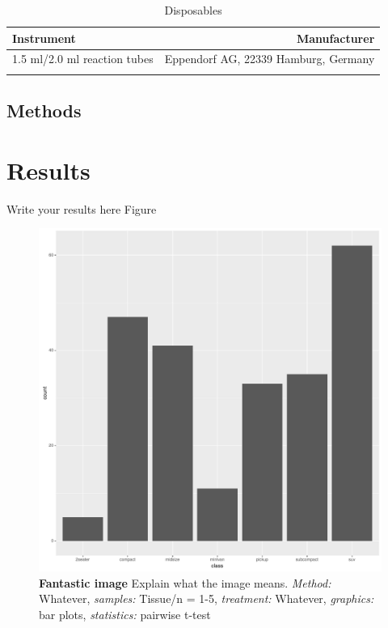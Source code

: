 \documentclass[
	    a4paper, 				%
	    bibliography=totocnumbered,		%
	    listof=totocnumbered,		%
	    11pt, 				%
]{scrreprt}
\begin{document}
				\begin{longtable}{||l|r||}
					Instrument&Manufacturer\\
					\hline\hline
						\multirow{2}{0.62\textwidth}{1.5 ml/2.0 ml reaction tubes}&
						\multirow{2}{0.30\textwidth}{Eppendorf AG, 22339 Hamburg, Germany}\\&\\										
					\hline\hline
					\caption{Disposables}
				\end{longtable}
		
		\section{Methods}		

	\chapter{Results}
		Write your results here
		Figure

		\begin{figure}
			\includegraphics[width=\textwidth]{images/barplot.pdf}
			\caption{\textbf{Fantastic image} 
				\newline 
				Explain what the image means.
				\newline
				\textit{Method:} Whatever, 
				\textit{samples:} Tissue/n = 1-5, 
				\textit{treatment:} Whatever, 
				\textit{graphics:} bar plots,
				\textit{statistics:} pairwise t-test
			}
			\label{barplot}
		\end{figure}
\end{document}
